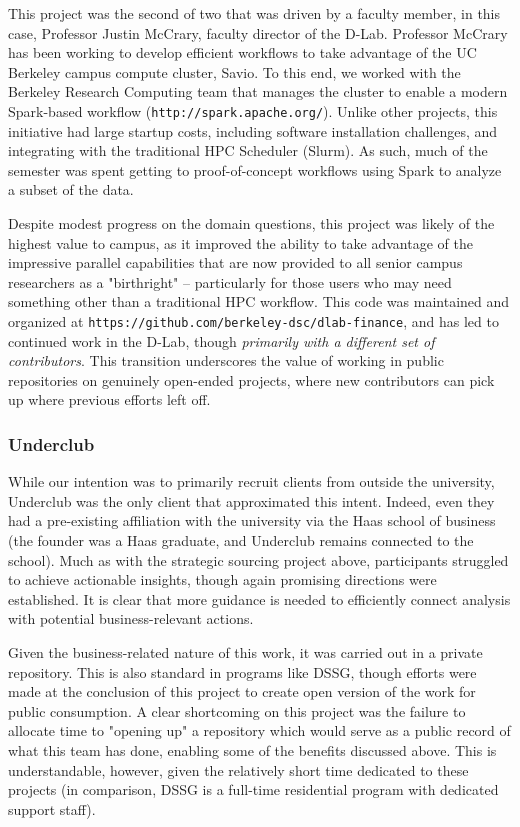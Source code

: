 \documentclass{sig-alternate}
\begin{document}
This project was the second of two that was driven by a faculty member, in this case, Professor Justin McCrary, faculty director of the D-Lab. Professor McCrary has been working to develop efficient workflows to take advantage of the UC Berkeley campus compute cluster, Savio. To this end, we worked with the Berkeley Research Computing team that manages the cluster to enable a modern Spark-based workflow (\texttt{http://spark.apache.org/}). Unlike other projects, this initiative had large startup costs, including software installation challenges, and integrating with the traditional HPC Scheduler (Slurm). As such, much of the semester was spent getting to proof-of-concept workflows using Spark to analyze a subset of the data.

Despite modest progress on the domain questions, this project was likely of the highest value to campus, as it improved the ability to take advantage of the impressive parallel capabilities that are now provided to all senior campus researchers as a "birthright" -- particularly for those users who may need something other than a traditional HPC workflow. This code was maintained and organized at \texttt{https://github.com/berkeley-dsc/dlab-finance}, and has led to continued work in the D-Lab, though \emph{primarily with a different set of contributors}. This transition underscores the value of working in public repositories on genuinely open-ended projects, where new contributors can pick up where previous efforts left off. 

\subsubsection*{Underclub}

While our intention was to primarily recruit clients from outside the university, Underclub was the only client that approximated this intent. Indeed, even they had a pre-existing affiliation with the university via the Haas school of business (the founder was a Haas graduate, and Underclub remains connected to the school). Much as with the strategic sourcing project above, participants struggled to achieve actionable insights, though again promising directions were established. It is clear that more guidance is needed to efficiently connect analysis with potential business-relevant actions.

Given the business-related nature of this work, it was carried out in a private repository. This is also standard in programs like DSSG, though efforts were made at the conclusion of this project to create open version of the work for public consumption. A clear shortcoming on this project was the failure to allocate time to "opening up" a repository which would serve as a public record of what this team has done, enabling some of the benefits discussed above. This is understandable, however, given the relatively short time dedicated to these projects (in comparison, DSSG is a full-time residential program with dedicated support staff).
\end{document}
